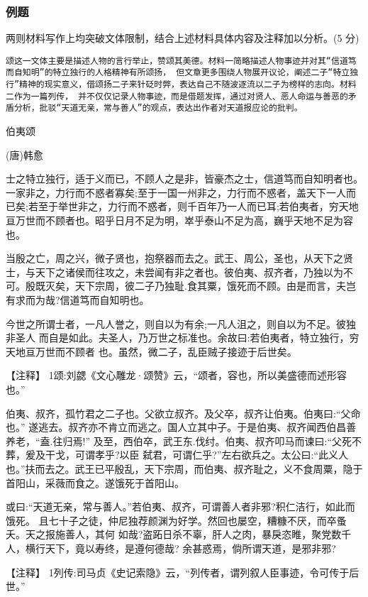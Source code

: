 \documentclass{ctexart}
\newcommand{\nm}{\normalsize}
\newcommand{\blkz}{\vspace*{2\baselineskip} }
\renewcommand{\\}{\par}
\begin{document}
\subsubsection{例题}
\fangsong
两则材料写作上均突破文体限制，结合上述材料具体内容及注释加以分析。(5 分)\\
\texttt{颂这一文体主要是描述人物的言行举止，赞颂其美德。材料一简略描述人物事迹并对其“信道笃而自知明”的特立独行的人格精神有所颂扬，
但文章更多围绕人物展开议论，阐述二子“特立独行”精神的现实意义，借颂扬二子来针砭时弊，表达自己不随波逐流以二子为榜样的志向。材料二作为一篇列传，
并不仅仅记录人物事迹，而是借题发挥，通过对贤人、恶人命运与善恶的矛盾分析，批驳“天道无亲，常与善人”的观点，表达出作者对天道报应论的批判。}

\nm \fangsong
\centerline{伯夷颂}\\ \centerline{(唐)韩愈}\\
士之特立独行，适于义而已，不顾人之是非，皆豪杰之士，信道笃而自知明者也。一家非之，力行而不惑者寡矣;至于一国一州非之，力行而不惑者，盖天下一人而已矣;若至于举世非之，力行而不惑者，则千百年乃一人而已耳;若伯夷者，穷天地亘万世而不顾者也。昭乎日月不足为明，崒乎泰山不足为高，巍乎天地不足为容也。\\
当殷之亡，周之兴，微子贤也，抱祭器而去之。武王、周公，圣也，从天下之贤士，与天下之诸侯而往攻之，未尝闻有非之者也。彼伯夷、叔齐者，乃独以为不可。殷既灭矣，天下宗周，彼二子乃独耻.食其粟，饿死而不顾。由是而言，夫岂有求而为哉?信道笃而自知明也。\\
今世之所谓士者，一凡人誉之，则自以为有余;一凡人沮之，则自以为不足。彼独非圣人 而自是如此。夫圣人，乃万世之标准也。余故曰:若伯夷者，特立独行，穷天地亘万世而不顾者 也。虽然，微二子，乱臣贼子接迹于后世矣。\\
\noindent【注释】 1颂:刘勰《文心雕龙·颂赞》云，“颂者，容也，所以美盛德而述形容也。” \\
\blkz
伯夷、叔齐，孤竹君之二子也。父欲立叔齐。及父卒，叔齐让伯夷。伯夷曰:“父命也。” 遂逃去。叔齐亦不肯立而逃之。国人立其中子。于是伯夷、叔齐闻西伯昌善养老，“盍.往归焉!” 及至，西伯卒，武王东.伐纣。伯夷、叔齐叩马而谏曰:“父死不葬，爰及干戈，可谓孝乎?以臣 弑君，可谓仁乎?”左右欲兵之。太公曰:“此义人也。”扶而去之。武王已平殷乱，天下宗周，而伯夷、叔齐耻之，义不食周粟，隐于首阳山，采薇而食之。遂饿死于首阳山。\\
或曰:“天道无亲，常与善人。”若伯夷、叔齐，可谓善人者非邪?积仁洁行，如此而饿死。 且七十子之徒，仲尼独荐颜渊为好学。然回也屡空，糟糠不厌，而卒蚤夭。天之报施善人，其何 如哉?盗跖日杀不辜，肝人之肉，暴戾恣睢，聚党数千人，横行天下，竟以寿终，是遵何德哉? 余甚惑焉，倘所谓天道，是邪非邪?\\
\noindent【注释】 1列传:司马贞《史记索隐》云，“列传者，谓列叙人臣事迹，令可传于后世。”
\end{document}
